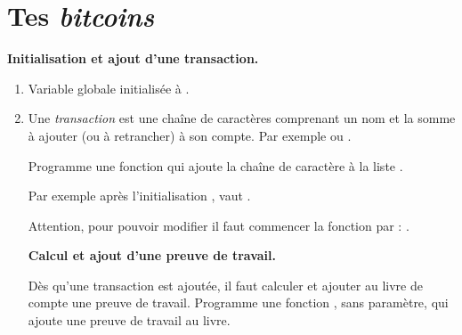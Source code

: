 \documentclass[12pt,class=report,crop=false]{standalone}
\begin{document}
\newpage


\section*{Tes \emph{bitcoins}}


\newpage

\textbf{Initialisation et ajout d'une transaction.}
  
  \begin{enumerate}
    \item Variable globale  initialisée à  .
  
    \item Une \emph{transaction} est une chaîne de caractères comprenant un nom et la somme à ajouter (ou à retrancher) à son compte. Par exemple  ou .
    
    Programme une fonction  qui ajoute la chaîne de caractère  à la liste .
    
     
Par exemple après l'initialisation 
,  
     vaut \ci{[ [0, 0, 0, 0, 0, 0], "Camille +100" ]}.
    
    
    Attention, pour pouvoir modifier  il faut commencer la fonction par : .
 
\newpage

 \textbf{Calcul et ajout d'une preuve de travail.}  

Dès qu'une transaction est ajoutée, il faut calculer et ajouter au livre de compte une preuve de travail. Programme une fonction , sans paramètre, qui ajoute une preuve de travail au livre.   
   

\end{enumerate}
\end{document}
